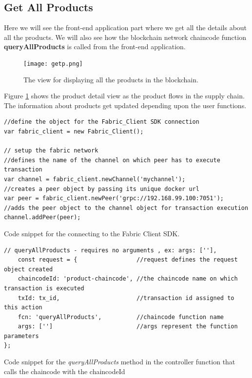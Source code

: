 \documentclass[
  a4paper,  %
  twoside,  %
  bibliography=totoc,
  headsepline,
  cleardoublepage=empty,
  parskip=half,
  draft=false
]{scrbook}
\begin{document}
\subsection{Get All Products}
Here we will see the front-end application part where we get all the details about all the products. We will also see how the blockchain network chaincode function \textbf{queryAllProducts} is called from the front-end application.

\begin{figure}[h!]
\begin{center}
\texttt{[image: getp.png]}
\caption{The view for displaying all the products in the blockchain.}
\label{fig:ga}
\end{center}
\end{figure}
Figure \ref{fig:ga} shows the product detail view as the product flows in the supply chain. The information about products get updated depending upon the user functions.
\begin{Listing}[h!]
\begin{lstlisting}
//define the object for the Fabric_Client SDK connection
var fabric_client = new Fabric_Client();

// setup the fabric network
//defines the name of the channel on which peer has to execute transaction
var channel = fabric_client.newChannel('mychannel');
//creates a peer object by passing its unique docker url
var peer = fabric_client.newPeer('grpc://192.168.99.100:7051');
//adds the peer object to the channel object for transaction execution
channel.addPeer(peer);
\end{lstlisting}
\caption{Code snippet for the connecting to the Fabric Client SDK.}
\label{lst:fc}
\end{Listing}
\begin{Listing}[h!]
\begin{lstlisting}
// queryAllProducts - requires no arguments , ex: args: [''],
    const request = {                 //request defines the request object created
    chaincodeId: 'product-chaincode', //the chaincode name on which transaction is executed
    txId: tx_id,                      //transaction id assigned to this action
    fcn: 'queryAllProducts',          //chaincode function name
    args: ['']                        //args represent the function parameters
};
\end{lstlisting}
\caption{Code snippet for the \textit{queryAllProducts} method in the controller function that calls the chaincode with the chaincodeId}
\label{lst:gapd}
\end{Listing}
\end{document}
